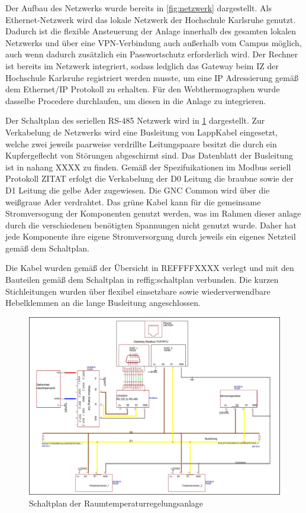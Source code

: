 Der Aufbau des Netzwerks wurde bereits in \ref{fig:netzwerk} dargestellt. Als Ethernet-Netzwerk wird das lokale Netzwerk der Hochschule Karlsruhe genutzt. Dadurch ist die flexible Ansteuerung der Anlage innerhalb des gesamten lokalen Netzwerks und über eine VPN-Verbindung auch außerhalb vom Campus möglich, auch wenn dadurch zusätzlich ein Passwortschutz erforderlich wird. Der Rechner ist bereits im Netzwerk integriert, sodass ledglich das Gateway beim IZ der Hochschule Karlsruhe registriert werden musste, um eine IP Adressierung gemäß dem Ethernet/IP Protokoll zu erhalten.
Für den Webthermographen wurde dasselbe Procedere durchlaufen, um diesen in die Anlage zu integrieren.

Der Schaltplan des seriellen RS-485 Netzwerk wird in \ref{fig:schaltplan} dargestellt. Zur Verkabelung de Netzwerks wird eine Busleitung von LappKabel eingesetzt, welche zwei jeweils paarweise verdrillte Leitungspaare
besitzt die durch ein Kupfergeflecht von Störungen abgeschirmt sind. Das Datenblatt der Busleitung ist in nahang XXXX zu finden.
Gemäß der Spezifuikationen im Modbus seriell Protokoll ZITAT erfolgt die Verkabelung der D0 Leitung die braubne sowie der D1 Leitung die gelbe Ader zugewiesen. Die GNC Common wird über die weißgraue Ader verdrahtet. Das grüne Kabel kann für die gemeinsame Stromversogung der Komponenten genutzt werden, was im Rahmen dieser anlage durch die verschiedenen benötigten Spannungen nicht genutzt wurde. Daher hat jede Komponente ihre eigene Stromversorgung durch jeweils ein eigenes Netzteil gemäß dem Schaltplan. 

Die Kabel wurden gemäß der Übersicht in REFFFFXXXX verlegt und mit den Bauteilen gemäß dem Schaltplan in ref{fig:schaltplan} verbunden. Die kurzen Stichleitungen wurden über flexibel einsetzbare sowie wiederverwendbare Hebelklemmen an die lange Busleitung angeschlossen.


\begin{figure}
\centering
\includegraphics[width=\textwidth]{abbildungen/20160326_schaltplan}
\caption{Schaltplan der Raumtemperaturregelungsanlage}
\label{fig:schaltplan}
\end{figure}

